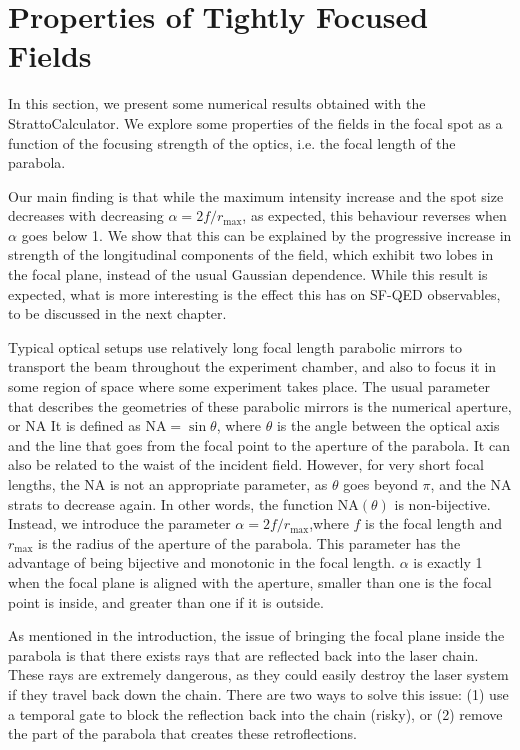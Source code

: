 \documentclass[11pt,SymmetricalJury]{inrsthesis/inrsthesis}
\begin{document}
\section{Properties of Tightly Focused Fields}

In this section, we present some numerical results obtained with the
StrattoCalculator. We explore some properties of the fields in the focal
spot as a function of the focusing strength of the optics, i.e. the
focal length of the parabola.

Our main finding is that while the maximum intensity increase and the spot
size decreases with decreasing $\alpha=2f/r_\text{max}$, as expected, this
behaviour reverses when $\alpha$ goes below 1. We show that this can be
explained by the progressive increase in strength of the longitudinal components
of the field, which exhibit two lobes in the focal plane, instead of the usual
Gaussian dependence. While this result is expected, what is more interesting is
the effect this has on SF-QED observables, to be discussed in the next chapter.


Typical optical setups use relatively long focal length parabolic mirrors to
transport the beam throughout the experiment chamber, and also to focus it in
some region of space where some experiment takes place. The usual parameter that
describes the geometries of these parabolic mirrors is the numerical aperture,
or NA­ It is defined as $\text{NA}=\sin\theta$, where $\theta$ is the angle
between the optical axis and the line that goes from the focal point to the
aperture of the parabola. It can also be related to the waist of the incident
field. However, for very short focal lengths, the NA is not an appropriate
parameter, as $\theta$ goes beyond $\pi$, and the NA strats to decrease again.
In other words, the function $\text{NA}(\theta)$ is non-bijective. Instead, we
introduce the parameter $\alpha=2f/r_ \text{max}$,where $f$ is the focal length
and $r_\text{max}$ is the radius of the aperture of the parabola. This parameter
has the advantage of being bijective and monotonic in the focal length. $\alpha$
is exactly 1 when the focal plane is aligned with the aperture, smaller than one
is the focal point is inside, and greater than one if it is outside.

As mentioned in the introduction, the issue of bringing the focal plane inside
the parabola is that there exists rays that are reflected back into the laser
chain. These rays are extremely dangerous, as they could easily destroy the
laser system if they travel back down the chain. There are two ways to solve
this issue: (1) use a temporal gate to block the reflection back into the chain
(risky), or (2) remove the part of the parabola that creates these
retroflections.
\end{document}
